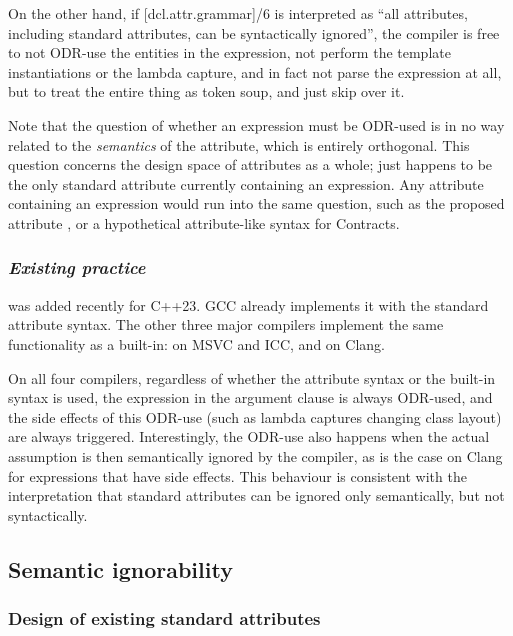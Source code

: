 On the other hand, if [dcl.attr.grammar]/6 is interpreted as ``all attributes, including standard attributes, can be syntactically ignored'', the compiler is free to not ODR-use the entities in the expression, not perform the template instantiations or the lambda capture, and in fact not parse the expression at all, but to treat the entire thing as token soup, and just skip over it.

Note that the question of whether an expression must be ODR-used is in no way related to the \emph{semantics} of the  attribute, which is entirely orthogonal. This question concerns the design space of attributes as a whole;  just happens to be the only standard attribute currently containing an expression. Any attribute containing an expression would run into the same question, such as the proposed  attribute \cite{P1144R5}, or a hypothetical attribute-like syntax for Contracts.

\subsubsection*{\emph{Existing practice}}

 was added recently for C++23. GCC already implements it with the standard attribute syntax. The other three major compilers implement the same functionality as a built-in:  on MSVC and ICC, and \mbox{} on Clang.

On all four compilers, regardless of whether the attribute syntax or the built-in syntax is used, the expression in the argument clause is always ODR-used, and the side effects of this ODR-use (such as lambda captures changing class layout) are always triggered. Interestingly, the ODR-use also happens when the actual assumption is then semantically ignored by the compiler, as is the case on Clang for expressions that have side effects. This behaviour is consistent with the interpretation that standard attributes can be ignored only semantically, but not syntactically.

\subsection{Semantic ignorability}
\label{subsec:semantic}

\subsubsection{Design of existing standard attributes}

